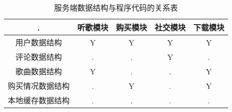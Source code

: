 \begin{table}[htbp]
    \centering
    \caption{服务端数据结构与程序代码的关系表} \label{tab:datastructure-module}
    \begin{tabular}{|c|c|c|c|c|}
        \hline
        . & 听歌模块 & 购买模块 & 社交模块 & 下载模块 \\
        \hline
        用户数据结构 & Y & Y & Y & Y \\
        \hline
        评论数据结构 & . & . & Y & . \\
        \hline
        歌曲数据结构 & Y & . & . & Y \\
        \hline
        购买情况数据结构 & . & Y & . & Y \\
        \hline
        本地缓存数据结构 & . & . & . & . \\
        \hline
    \end{tabular}
    \end{table}